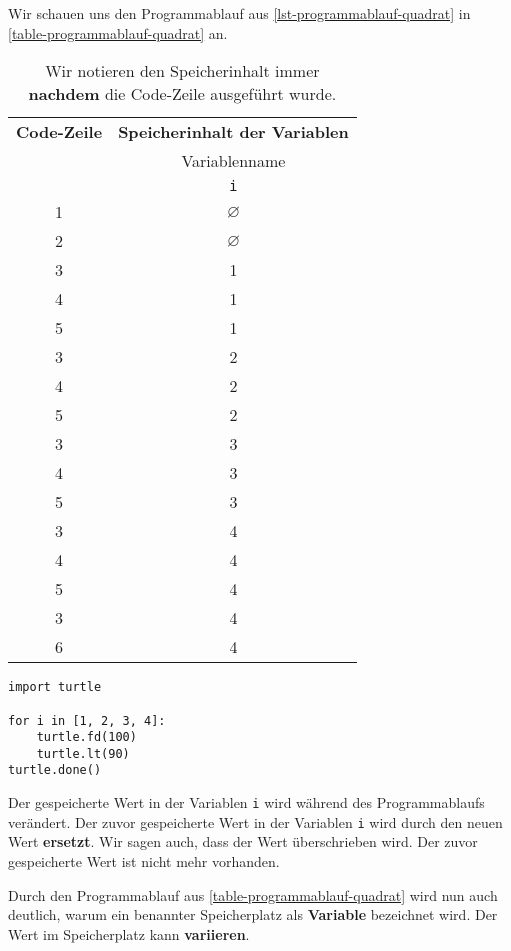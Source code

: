 \begin{example}
Wir schauen uns den Programmablauf aus \autoref{lst-programmablauf-quadrat} in \autoref{table-programmablauf-quadrat} an.

\begin{table}[htb]
\centering
\begin{minipage}{0.4\textwidth}
\centering
\begin{tabular}{cc}
\toprule
\textbf{Code-Zeile} & \textbf{Speicherinhalt der Variablen} \\
			   & Variablenname \\
			   & \lstinline[]$i$ \\
\midrule
1 & $\varnothing$ \\
2 & $\varnothing$ \\ \hline
3 & 1 \\
4 & 1 \\
5 & 1 \\ \hline
3 & 2 \\
4 & 2 \\
5 & 2 \\ \hline
3 & 3 \\
4 & 3 \\
5 & 3 \\ \hline
3 & 4 \\
4 & 4 \\
5 & 4 \\
3 & 4 \\
6 & 4 \\
\bottomrule
\end{tabular}
\caption{Wir notieren den Speicherinhalt immer \textbf{nachdem} die Code-Zeile ausgeführt wurde.}
\label{table-programmablauf-quadrat}
\end{minipage}
\hfill
\begin{minipage}{0.45\textwidth}
\centering
	\begin{lstlisting}[caption={Zeile vier und fünf wird jeweils viermal ausgeführt (\graybgtexttt{quadrat\_loop.py}).}, label={lst-programmablauf-quadrat}]
import turtle

for i in [1, 2, 3, 4]:
    turtle.fd(100)
    turtle.lt(90)
turtle.done()
\end{lstlisting}

\begin{important}
	Der gespeicherte Wert in der Variablen \lstinline{i} wird während des Programmablaufs verändert. Der zuvor gespeicherte Wert in der Variablen \lstinline{i} wird durch den neuen Wert \textbf{ersetzt}. Wir sagen auch, dass der Wert überschrieben wird. Der zuvor gespeicherte Wert ist nicht mehr vorhanden.
\end{important}

\end{minipage}
\end{table}

Durch den Programmablauf aus \autoref{table-programmablauf-quadrat} wird nun auch deutlich, warum ein benannter Speicherplatz als \textbf{Variable} bezeichnet wird. Der Wert im Speicherplatz kann \textbf{variieren}.

\end{example}

